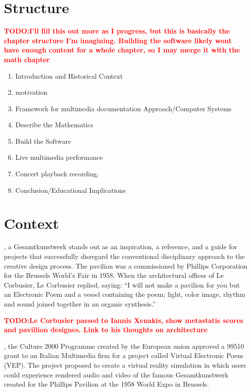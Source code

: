 \documentclass{tufte-book}
\newcommand{\TODO}[1]{\textcolor{red}{\bf TODO:#1}\xspace}
\begin{document}
\section{Structure}
\label{sec:structure}
\TODO{I'll fill this out more as I progress, but this is basically the
  chapter structure I'm imagining. Building the software likely wont
  have enough content for a whole chapter, so I may merge it with the
  math chapter}
\begin{enumerate}
\item Introduction and  Historical Context %
\item motivation
\item Framework for multimedia documentation Approach/Computer Systems
\item Describe the Mathematics 
\item Build the Software
\item Live multimedia performance
\item Concert playback recording. 
\item Conclusion/Educational Implications
\end{enumerate}

\section{Context}
\label{sec:context}

, a Gesamtkunstwerk stands out as an
inspiration, a reference, and a guide for projects that successfully
disregard the conventional disciplinary approach to the creative
design process. The pavilion was a commissioned by Phillips
Corporation for the Brussels World's Fair in 1958.\cite{Zvonare} When
the architectural offices of Le Corbusier, Le Corbusier replied,
saying: ``I will not make a pavilion for you but an Electronic Poem and
a vessel containing the poem; light, color image, rhythm and sound
joined together in an organic synthesis.''\cite{Lopez2011}

\TODO{Le Corbusier passed to Iannis Xenakis, show metastatis scores
  and pavillion designes. Link to his thoughts on architecture} 

, the Culture 2000 Programme created by the 
European union approved a 99510\EUR{} grant to an Italian Multimedia 
firm for a project called Virtual Electronic Poem (VEP)\cite{eu2004}. 
The project proposed to create a virtual reality simulation in which 
users could experience rendered audio and video of the famous
Gesamtkunstwerk created for the Phillips Pavilion at the 1958 World
Expo in Brussels. 
\end{document}
